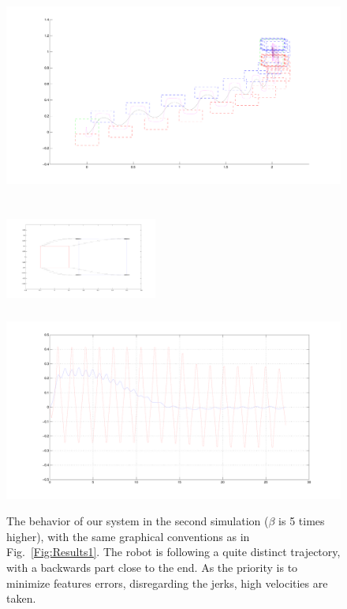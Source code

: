 \begin{figure}[h]
\begin{minipage}{0.5\textwidth}
 \centering
 \includegraphics[scale=.3]{Chap4-Visual-Servoing/steps2_hrp2.pdf}
\end{minipage}
\begin{minipage}{0.5\textwidth}
 \centering
 \includegraphics[width=5cm,height=4cm]{Chap4-Visual-Servoing/features2_hrp2.pdf}
\\
 \includegraphics[scale=.2]{Chap4-Visual-Servoing/vels2_hrp2.pdf}
\end{minipage}
 \caption[]{\label{Fig:Results2}\small{The behavior of our system in the second simulation ($\beta$ is 5 times higher), with the same graphical conventions as in Fig.~\ref{Fig:Results1}. The robot is following a quite distinct trajectory, with a backwards part close to the end. As the priority is to minimize features errors, disregarding the jerks, high velocities are taken.}}
 \end{figure}

